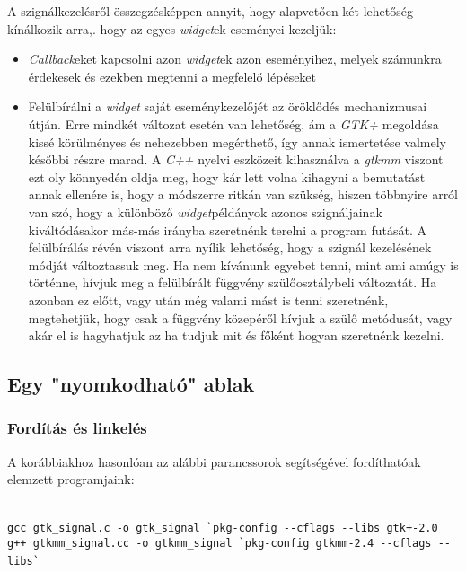 \documentclass[a4paper,10pt]{article}
\begin{document}
A szignálkezelésről összegzésképpen annyit, hogy alapvetően két lehetőség kínálkozik arra,. hogy az egyes \textit{widget}ek eseményei kezeljük:

\begin{itemize}
 \item \textit{Callback}eket kapcsolni azon \textit{widget}ek azon eseményihez, melyek számunkra érdekesek és ezekben megtenni a megfelelő lépéseket

 \item Felülbírálni a \textit{widget} saját eseménykezelőjét az öröklődés mechanizmusai útján. Erre mindkét változat esetén van lehetőség, ám a \textit{GTK+} megoldása kissé körülményes és nehezebben megérthető, így annak ismertetése valmely későbbi részre marad. A \textit{C++} nyelvi eszközeit kihasználva a \textit{gtkmm} viszont ezt oly könnyedén oldja meg, hogy kár lett volna kihagyni a bemutatást annak ellenére is, hogy a módszerre ritkán van szükség, hiszen többnyire arról van szó, hogy a különböző \textit{widget}példányok azonos szignáljainak kiváltódásakor más-más irányba szeretnénk terelni a program futását. A felülbírálás révén viszont arra nyílik lehetőség, hogy a szignál kezelésének módját változtassuk meg. Ha nem kívánunk egyebet tenni, mint ami amúgy is történne, hívjuk meg a felülbírált függvény szülőosztálybeli változatát. Ha azonban  ez előtt, vagy után még valami mást is tenni szeretnénk, megtehetjük, hogy csak a függvény közepéről hívjuk a szülő metódusát, vagy akár el is hagyhatjuk az ha tudjuk mit és főként hogyan szeretnénk kezelni.
\end{itemize}

\subsection{Egy "nyomkodható" ablak}

\subsubsection{Fordítás és linkelés}

A korábbiakhoz hasonlóan az alábbi parancssorok segítségével fordíthatóak e\-lem\-zett programjaink:

\fontsize{8pt}{8pt}
\ \\
\texttt{gcc gtk\_signal.c -o gtk\_signal \`{}pkg-config {-}-cflags {-}-libs gtk+-2.0}
\ \\
\texttt{g++ gtkmm\_signal.cc -o gtkmm\_signal \`{}pkg-config gtkmm-2.4 {-}-cflags {-}-libs\`{}}
\ \\
\end{document}
